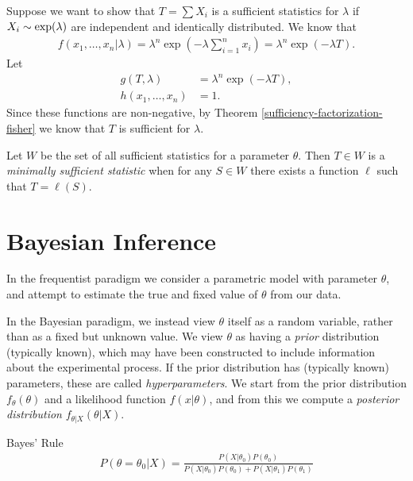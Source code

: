 \begin{exmp}
    Suppose we want to show that $T = \sum X_i$ is a sufficient statistics for $\lambda$ if $X_i \sim \textrm{exp}(\lambda)$ are independent and identically distributed. We know that
    \begin{align*}
        f(x_1, \ldots, x_n|\lambda) = \lambda^n\exp\left(-\lambda\sum_{i=1}^{n}x_i\right) = \lambda^n\exp\left(-\lambda T\right).
    \end{align*}
    Let
    \begin{align*}
        g(T,\lambda) &= \lambda^n\exp\left(-\lambda T\right), \\
        h(x_1, \ldots, x_n) &= 1.
    \end{align*}
    Since these functions are non-negative, by Theorem \ref{sufficiency-factorization-fisher} we know that $T$ is sufficient for $\lambda$.
\end{exmp}

\begin{defn}
    Let $W$ be the set of all sufficient statistics for a parameter $\theta$. Then $T \in W$ is a \emph{minimally sufficient statistic} when for any $S \in W$ there exists a function $\ell$ such that $T = \ell(S)$.
\end{defn}

\section{Bayesian Inference}

\begin{rmk}
    In the frequentist paradigm we consider a parametric model with parameter $\theta$, and attempt to estimate the true and fixed value of $\theta$ from our data.

    In the Bayesian paradigm, we instead view $\theta$ itself as a random variable, rather than as a fixed but unknown value. We view $\theta$ as having a \emph{prior} distribution (typically known), which may have been constructed to include information about the experimental process. If the prior distribution has (typically known) parameters, these are called \emph{hyperparameters}. We start from the prior distribution $f_{\theta}(\theta)$ and a likelihood function $f(x|\theta)$, and from this we compute a \emph{posterior distribution} $f_{\theta|X}(\theta|X)$.
\end{rmk}

\begin{defn}{Bayes' Rule}\proofbreak
    \begin{align*}
        P\left(\theta = \theta_0|X\right) = \frac{P\left(X|\theta_0\right)P(\theta_0)}{P\left(X|\theta_0\right)P(\theta_0) + P\left(X|\theta_1\right)P(\theta_1)}
    \end{align*}
\end{defn}

